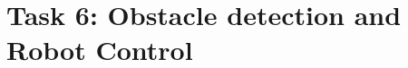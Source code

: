 \documentclass[15pt, a4paper, oneside]{report}
\begin{document}
\normalfont

\vspace*{5mm}

\section*{\Large Task 6: Obstacle detection and Robot Control}

\vspace{2mm}
    \Large
   
    
    
    
    
    

  
\vspace{1cm}
\end{document}
